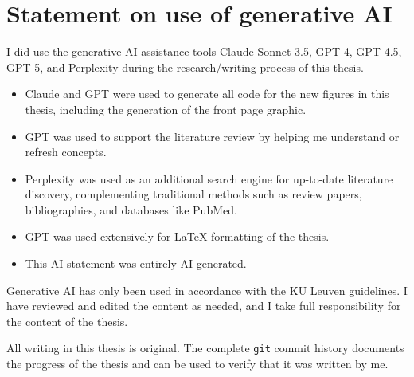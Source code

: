 \chapter*{Statement on use of generative AI}

I did use the generative AI assistance tools Claude Sonnet 3.5, GPT-4, GPT-4.5, GPT-5, and Perplexity during the research/writing process of this thesis.

\begin{itemize}[noitemsep]
	\item Claude and GPT were used to generate all code for the new figures in this thesis, including the generation of the front page graphic.
	\item GPT was used to support the literature review by helping me understand or refresh concepts.
	\item Perplexity was used as an additional search engine for up-to-date literature discovery, complementing traditional methods such as review papers, bibliographies, and databases like PubMed.
	\item GPT was used extensively for \LaTeX{} formatting of the thesis.
	\item This AI statement was entirely AI-generated.
\end{itemize}

Generative AI has only been used in accordance with the KU Leuven guidelines. I have reviewed and edited the content as needed, and I take full responsibility for the content of the thesis.

All writing in this thesis is original. The complete \texttt{git} commit history documents the progress of the thesis and can be used to verify that it was written by me.
